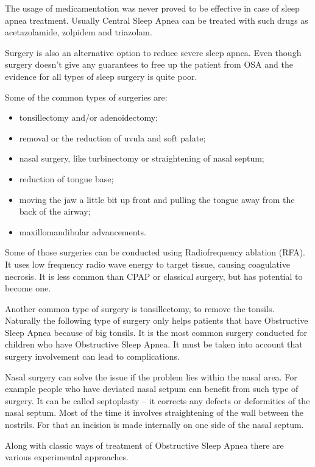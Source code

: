 The usage of medicamentation was never proved to be effective in case of sleep apnea treatment. Usually Central Sleep Apnea can be treated with such drugs as acetazolamide, zolpidem and triazolam.

Surgery is also an alternative option to reduce severe sleep apnea. Even though surgery doesn’t give any guarantees to free up the patient from OSA and the evidence for all types of sleep surgery is quite poor. 

Some of the common types of surgeries are:
\begin{itemize}[topsep=5pt, partopsep=0pt,itemsep=3pt,parsep=1pt]
 \item tonsillectomy and/or adenoidectomy;
 \item removal or the reduction of uvula and soft palate;
 \item nasal surgery, like turbinectomy or straightening of nasal septum;
 \item reduction of tongue base;
 \item moving the jaw a little bit up front and pulling the tongue away from the back of the airway;
 \item maxillomandibular advancements.
\end{itemize}

Some of those surgeries can be conducted using Radiofrequency ablation (RFA). It uses low frequency radio wave energy to target tissue, causing coagulative necrosis. It is less common than CPAP or classical surgery, but has potential to become one.

Another common type of surgery is tonsillectomy, to remove the tonsils. Naturally the following type of surgery only helps patients that have Obstructive Sleep Apnea because of big tonsils. It is the most common surgery conducted for children who have Obstructive Sleep Apnea. It must be taken into account that surgery involvement can lead to complications.

Nasal surgery can solve the issue if the problem lies within the nasal area. For example people who have deviated nasal setpum can benefit from such type of surgery. It can be called septoplasty -- it corrects any defects or deformities of the nasal septum. Most of the time it involves straightening of the wall between the nostrils. For that an incision is made internally on one side of the nasal septum.

Along with classic ways of treatment of Obstructive Sleep Apnea there are various experimental approaches. 

